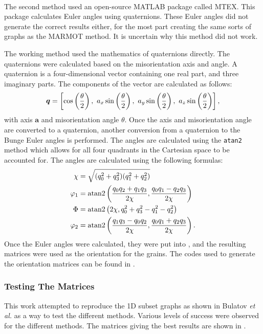\documentclass[12pt]{report}
\begin{document}
The second method used an open-source MATLAB\textsuperscript{\textregistered} package called MTEX.\cite{bachmann2010}  This package calculates Euler angles using quaternions.  These Euler angles did not generate the correct results either, for the most part creating the same sorts of graphs as the MARMOT method.  It is uncertain why this method did not work.

The working method used the mathematics of quaternions directly.\cite{weisstein2004}  The quaternions were calculated based on the misorientation axis and angle.  A quaternion is a four-dimensional vector containing one real part, and three imaginary parts.  The components of the vector are calculated as follows:
\begin{equation}
\label{eq:quat}
\bm{q}=\left[\textnormal{cos}\left(\frac{\theta}{2}\right),\ a_x\,\textnormal{sin}\left(\frac{\theta}{2}\right),\ a_y\,\textnormal{sin}\left(\frac{\theta}{2}\right),\ a_z\,\textnormal{sin}\left(\frac{\theta}{2}\right)\right],
\end{equation}
with axis $\bm{a}$ and misorientation angle $\theta$.  Once the axis and misorientation angle are converted to a quaternion, another conversion from a quaternion to the Bunge Euler angles is performed.  The angles are calculated using the \lstinline!atan2! method which allows for all four quadrants in the Cartesian space to be accounted for.  The angles are calculated using the following formulas:
\begin{align}
\label{eq:quat2euler}
\begin{aligned}
\chi &= \sqrt{(q_0^2+q_3^2)(q_1^2+q_2^2)}\\
\varphi_1 &= \textnormal{atan2}\left(\frac{q_0q_2+q_1q_3}{2\chi}, \frac{q_0q_1-q_2q_3}{2\chi}\right)\\
\Phi &= \textnormal{atan2}\left(2\chi, q_0^2+q_3^2-q_1^2-q_2^2\right)\\
\varphi_2 &= \textnormal{atan2}\left(\frac{q_1q_3-q_0q_2}{2\chi}, \frac{q_0q_1+q_2q_3}{2\chi}\right).
\end{aligned}
\end{align}
Once the Euler angles were calculated, they were put into , and the resulting matrices were used as the orientation for the grains.  The codes used to generate the orientation matrices can be found in .

\subsubsection{Testing The Matrices\label{PQ:Testing}}
This work attempted to reproduce the 1D subset graphs as shown in Bulatov \emph{et al.} as a way to test the different methods.  Various levels of success were observed for the different methods.  The matrices giving the best results are shown in .
\end{document}
